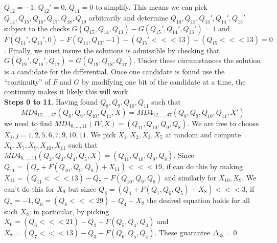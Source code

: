 $Q_{12}= -1$, $Q_{12}'=0$, $Q_{11}=0$ to simplify.
This means we can pick
$Q_{14}, Q_{15}, Q_{16}, Q_{17}, Q_{18}, Q_{19}$ 
arbitrarily and determine
$Q_{10}, Q_{13}, Q_{13}', Q_{14}', Q_{15}'$ subject to the checks
$ G(Q_{15}, Q_{14}, Q_{13}) - G(Q_{15}', Q_{14}', Q_{13}') = 1$ and
$ F(Q_{14}', Q_{13}', 0) - F(Q_{14}, Q_{13}, -1) -
(Q_{15}' <<< 13) + (Q_{15} <<< 13) = 0$.  Finally, we must insure the solutions is
admissible by checking that
$G(Q_{19}', Q_{18}', Q_{17}) = G(Q_{19}, Q_{18}, Q_{17})$.  Under these circumstances
the solution is a candidate for the differential.  Once one candidate is found
use the ``continuity'' of $F$ and $G$ by modifying one bit of the candidate at a time,
the continuity makes it likely this will work. \\
{\bf Steps 0 to 11}.  Having found $Q_{8 }, Q_{9 }, Q_{10}, Q_{11}$ such that
$$MD4_{12, \ldots, 47}(Q_{8 }, Q_{9 }, Q_{10}, Q_{11}, X)=
MD4_{12, \ldots, 47}(Q_{8 }, Q_{9 }, Q_{10}, Q_{11}, X')$$
we need to find
$MD4_{0, \ldots, 11}(IV,X) = (Q_{11}, Q_{10}, Q_{ 9}, Q_{ 8})$.  We are free
to choose
$X_j, j= 1,2,5,6,7,9,10,11$.  We pick
$ X_{ 1}, X_{ 2}, X_{ 3}, X_{ 5} $ at random and compute
$ X_{ 6}, X_{ 7}, X_{ 9}, X_{10} , X_{11} $ such that
$MD4_{6, \ldots, 11}(Q_{2 }, Q_{3 }, Q_{ 4}, Q_{ 5}, X)=
(Q_{11}, Q_{10}, Q_{ 9}, Q_{ 8})$.  Since
$Q_{11}= (Q_{7} +F(Q_{10}, Q_{ 9}, Q_{ 8}) + X_{11}) <<<19$,
if can do this by making
$X_{11}= (Q_{11} <<< 13) - Q_{7} - F(Q_{10}, Q_{ 9}, Q_{ 8})$ and
similarly for $X_{10}, X_{9}$.  We can't do this for $X_9$ but since
$Q_{ 8}= (Q_{4} +F(Q_{ 7}, Q_{ 6}, Q_{ 5}) + X_{8}) <<< 3$, if
$Q_7= -1, Q_6= (Q_8 <<< 29) -Q_4 -X_8$ the desired equation holds for
all such $X_8$; in particular, by picking
$X_{6}= (Q_{6} <<< 21) - Q_{2} - F(Q_{5}, Q_{4}, Q_{3})$ and
$X_{7}= (Q_{7} <<< 13) - Q_{3} - F(Q_{6}, Q_{5}, Q_{4})$.  These
guarantee $\Delta_{35}= 0$.
